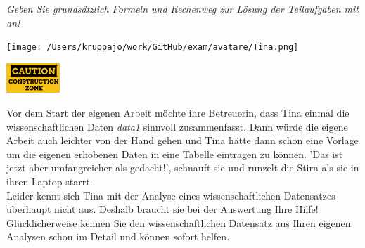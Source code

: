 \documentclass[a4paper, 9pt]{scrartcl}\usepackage[]{graphicx}\usepackage[]{xcolor}
\begin{document}
\textit{Geben Sie grundsätzlich Formeln und Rechenweg zur Lösung der Teilaufgaben mit an!} \\[1Ex]
 

 
\begin{minipage}[t]{0.5\textwidth}
\texttt{[image: /Users/kruppajo/work/GitHub/exam/avatare/Tina.png]}
\end{minipage}
\begin{minipage}[t]{0.5\textwidth}
\hfill
\href{https://youtu.be/C9skfFRTHhI}{\includegraphics[width = 2cm]{img/caution}}
\end{minipage}
\vspace{1ex}



Vor dem Start der eigenen Arbeit möchte ihre Betreuerin, dass Tina einmal die wissenschaftlichen Daten \textit{data1} sinnvoll zusammenfasst. Dann würde die eigene Arbeit auch leichter von der Hand gehen und Tina hätte dann schon eine Vorlage um die eigenen erhobenen Daten in eine Tabelle eintragen zu können. 'Das ist jetzt aber umfangreicher als gedacht!', schnauft sie und runzelt die Stirn als sie in ihren Laptop starrt.\\

Leider kennt sich Tina mit der Analyse eines wissenschaftlichen Datensatzes überhaupt nicht aus. Deshalb braucht sie bei der Auswertung Ihre Hilfe! Glücklicherweise kennen Sie den wissenschaftlichen Datensatz aus Ihren eigenen Analysen schon im Detail und können sofort helfen.
\end{document}

